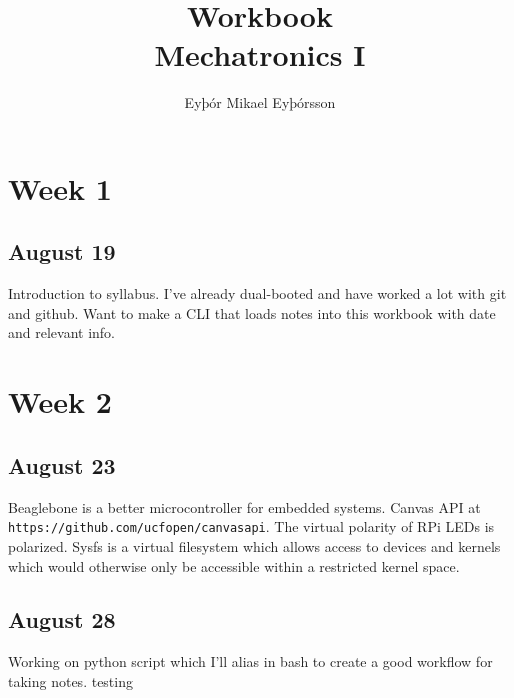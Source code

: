 \documentclass{article}
\title{Workbook\\Mechatronics I}
\author{Eyþór Mikael Eyþórsson}
\begin{document}
\maketitle
\section*{Week 1}
\subsection*{August 19}
Introduction to syllabus. 
I've already dual-booted and have worked a lot with git and github. 
Want to make a CLI that loads notes into this workbook with date and relevant info.
\section*{Week 2}
\subsection*{August 23}
Beaglebone is a better microcontroller for embedded systems.
Canvas API at \texttt{https://github.com/ucfopen/canvasapi}.
The virtual polarity of RPi LEDs is polarized.
Sysfs is a virtual filesystem which allows access to devices and kernels which would otherwise 
only be accessible within a restricted kernel space.
\subsection*{August 28}
Working on python script which I'll alias in bash to create a good workflow for taking notes.
testing
\end{document}
